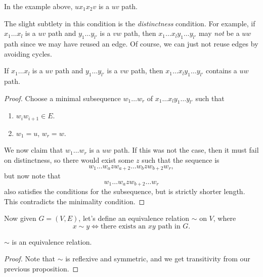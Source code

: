 \documentclass[a4paper]{scrreprt}
\begin{document}
In the example above, $u x_1 x_2 v$ is a $uv$ path. 

The slight subtlety in this condition is the \emph{distinctness} condition. For example, if $x_1 \dots x_l$ is a $uv$ path and $y_1 \dots y_{l'}$ is a $vw$ path, then $x_1 \dots x_l y_1 \dots y_{l'}$ may \emph{not} be a $uw$ path since we may have reused an edge. Of course, we can just not reuse edges by avoiding cycles.

\begin{proposition}
	If $x_1 \dots x_l$ is a $uv$ path and $y_1 \dots y_{l'}$ is a $vw$ path, then $x_1 \dots x_l y_1 \dots y_{l'}$ contains a $uw$ path.
\end{proposition}
\begin{proof}
	Choose a minimal subsequence $w_1 \dots w_r$ of $x_1 \dots x_l y_1 \dots y_{l'}$ such that
	\begin{enumerate}
		\item $w_i w_{i + 1} \in E$.
		\item $w_1 = u$, $w_r = w$.
	\end{enumerate}
	We now claim that $w_1 \dots w_r$ is a $uw$ path. If this was not the case, then it must fail on distinctness, so there would exist some $z$ such that the sequence is
	$$
	w_1 \dots w_{a} z w_{a + 2} \dots w_b z w_{b + 2} w_r,
	$$
	but now note that
	$$
	w_1 \dots w_{a}zw_{b+2} \dots w_r
	$$
	also satisfies the conditions for the subsequence, but is strictly shorter length. This contradicts the minimality condition.
\end{proof}

Now given $G = (V, E)$, let's define an equivalence relation $\sim$ on $V$, where
$$
x \sim y \iff \text{there exists an $xy$ path in $G$}.
$$

\begin{proposition}
	$\sim$ is an equivalence relation.
\end{proposition}
\begin{proof}
	Note that $\sim$ is reflexive and symmetric, and we get transitivity from our previous proposition.
\end{proof}
\end{document}
